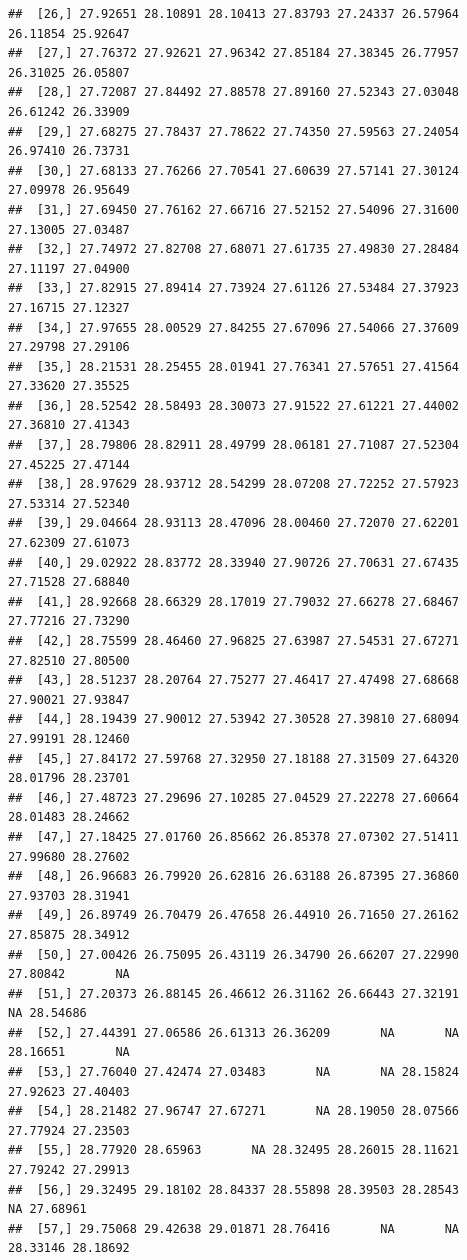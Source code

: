 \documentclass{article}\usepackage[]{graphicx}\usepackage[]{color}
\makeatletter
\newenvironment{kframe}{%
 \def\at@end@of@kframe{}%
 \ifinner\ifhmode%
  \def\at@end@of@kframe{\end{minipage}}%
  \begin{minipage}{\columnwidth}%
 \fi\fi%
 \def\FrameCommand##1{\hskip\@totalleftmargin \hskip-\fboxsep
 \colorbox{shadecolor}{##1}\hskip-\fboxsep
     \hskip-\linewidth \hskip-\@totalleftmargin \hskip\columnwidth}%
 \MakeFramed {\advance\hsize-\width
   \@totalleftmargin\z@ \linewidth\hsize
   \@setminipage}}%
 {\par\unskip\endMakeFramed%
 \at@end@of@kframe}
\newenvironment{knitrout}{}{} %
\makeatother
\begin{document}
\begin{knitrout}
\begin{kframe}
\begin{verbatim}
##  [26,] 27.92651 28.10891 28.10413 27.83793 27.24337 26.57964 26.11854 25.92647
##  [27,] 27.76372 27.92621 27.96342 27.85184 27.38345 26.77957 26.31025 26.05807
##  [28,] 27.72087 27.84492 27.88578 27.89160 27.52343 27.03048 26.61242 26.33909
##  [29,] 27.68275 27.78437 27.78622 27.74350 27.59563 27.24054 26.97410 26.73731
##  [30,] 27.68133 27.76266 27.70541 27.60639 27.57141 27.30124 27.09978 26.95649
##  [31,] 27.69450 27.76162 27.66716 27.52152 27.54096 27.31600 27.13005 27.03487
##  [32,] 27.74972 27.82708 27.68071 27.61735 27.49830 27.28484 27.11197 27.04900
##  [33,] 27.82915 27.89414 27.73924 27.61126 27.53484 27.37923 27.16715 27.12327
##  [34,] 27.97655 28.00529 27.84255 27.67096 27.54066 27.37609 27.29798 27.29106
##  [35,] 28.21531 28.25455 28.01941 27.76341 27.57651 27.41564 27.33620 27.35525
##  [36,] 28.52542 28.58493 28.30073 27.91522 27.61221 27.44002 27.36810 27.41343
##  [37,] 28.79806 28.82911 28.49799 28.06181 27.71087 27.52304 27.45225 27.47144
##  [38,] 28.97629 28.93712 28.54299 28.07208 27.72252 27.57923 27.53314 27.52340
##  [39,] 29.04664 28.93113 28.47096 28.00460 27.72070 27.62201 27.62309 27.61073
##  [40,] 29.02922 28.83772 28.33940 27.90726 27.70631 27.67435 27.71528 27.68840
##  [41,] 28.92668 28.66329 28.17019 27.79032 27.66278 27.68467 27.77216 27.73290
##  [42,] 28.75599 28.46460 27.96825 27.63987 27.54531 27.67271 27.82510 27.80500
##  [43,] 28.51237 28.20764 27.75277 27.46417 27.47498 27.68668 27.90021 27.93847
##  [44,] 28.19439 27.90012 27.53942 27.30528 27.39810 27.68094 27.99191 28.12460
##  [45,] 27.84172 27.59768 27.32950 27.18188 27.31509 27.64320 28.01796 28.23701
##  [46,] 27.48723 27.29696 27.10285 27.04529 27.22278 27.60664 28.01483 28.24662
##  [47,] 27.18425 27.01760 26.85662 26.85378 27.07302 27.51411 27.99680 28.27602
##  [48,] 26.96683 26.79920 26.62816 26.63188 26.87395 27.36860 27.93703 28.31941
##  [49,] 26.89749 26.70479 26.47658 26.44910 26.71650 27.26162 27.85875 28.34912
##  [50,] 27.00426 26.75095 26.43119 26.34790 26.66207 27.22990 27.80842       NA
##  [51,] 27.20373 26.88145 26.46612 26.31162 26.66443 27.32191       NA 28.54686
##  [52,] 27.44391 27.06586 26.61313 26.36209       NA       NA 28.16651       NA
##  [53,] 27.76040 27.42474 27.03483       NA       NA 28.15824 27.92623 27.40403
##  [54,] 28.21482 27.96747 27.67271       NA 28.19050 28.07566 27.77924 27.23503
##  [55,] 28.77920 28.65963       NA 28.32495 28.26015 28.11621 27.79242 27.29913
##  [56,] 29.32495 29.18102 28.84337 28.55898 28.39503 28.28543       NA 27.68961
##  [57,] 29.75068 29.42638 29.01871 28.76416       NA       NA 28.33146 28.18692

\end{verbatim}
\end{kframe}
\end{knitrout}
\end{document}

